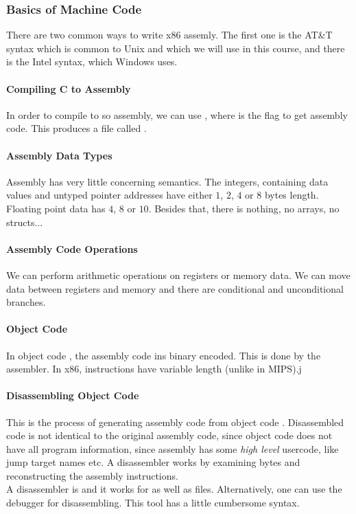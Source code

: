 \subsubsection{Basics of Machine Code}
There are two common ways to write x86 assemly. The first one is the AT\&T syntax which is common to Unix and which we will use in this course, and there is the Intel syntax, which Windows uses.

\paragraph{Compiling C to Assembly}
In order to compile to so assembly, we can use , where  is the flag to get assembly code. This produces a file called .

\paragraph{Assembly Data Types}
Assembly has very little concerning semantics. The integers, containing data values and untyped pointer addresses have either $1$, $2$, $4$ or $8$ bytes length. Floating point data has $4$, $8$ or $10$. Besides that, there is nothing, no arrays, no structs...

\paragraph{Assembly Code Operations}
We can perform arithmetic operations on registers or memory data. We can move data between registers and memory and there are conditional and unconditional branches.

\paragraph{Object Code}
In object code , the assembly code  ins binary encoded. This is done by the assembler. In x86, instructions have variable length (unlike in MIPS).j

\paragraph{Disassembling Object Code}
This is the process of generating assembly code  from object code . Disassembled code is not identical to the original assembly code, since object code does not have all program information, since assembly has some \textit{high level} usercode, like jump target names etc. A disassembler works by examining bytes and reconstructing the assembly instructions.\\
A disassembler is  and it works for  as well as  files. Alternatively, one can use the  debugger for disassembling. This tool has a little cumbersome syntax.

